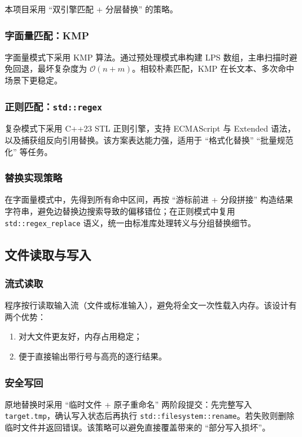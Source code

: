 \documentclass[12pt, a4paper]{ctexart}
\begin{document}
本项目采用 ``双引擎匹配 + 分层替换'' 的策略。

\subsubsection{字面量匹配：KMP}

字面量模式下采用 KMP 算法。通过预处理模式串构建 LPS 数组，主串扫描时避免回退，最坏复杂度为 $\mathcal{O}\left(n+m\right)$。相较朴素匹配，KMP 在长文本、多次命中场景下更稳定。

\subsubsection{正则匹配：\texttt{std::regex}}

复杂模式下采用 C++23 STL 正则引擎，支持 ECMAScript 与 Extended 语法，以及捕获组反向引用替换。该方案表达能力强，适用于 ``格式化替换'' ``批量规范化'' 等任务。

\subsubsection{替换实现策略}

在字面量模式中，先得到所有命中区间，再按 ``游标前进 + 分段拼接'' 构造结果字符串，避免边替换边搜索导致的偏移错位；在正则模式中复用 \texttt{std::regex_replace} 语义，统一由标准库处理转义与分组替换细节。

\subsection{文件读取与写入}

\subsubsection{流式读取}

程序按行读取输入流（文件或标准输入），避免将全文一次性载入内存。该设计有两个优势：

\begin{enumerate}
    \item 对大文件更友好，内存占用稳定；
    \item 便于直接输出带行号与高亮的逐行结果。
\end{enumerate}

\subsubsection{安全写回}

原地替换时采用 ``临时文件 + 原子重命名'' 两阶段提交：先完整写入 \texttt{target.tmp}，确认写入状态后再执行 \texttt{std::filesystem::rename}。若失败则删除临时文件并返回错误。该策略可以避免直接覆盖带来的 ``部分写入损坏''。
\end{document}
